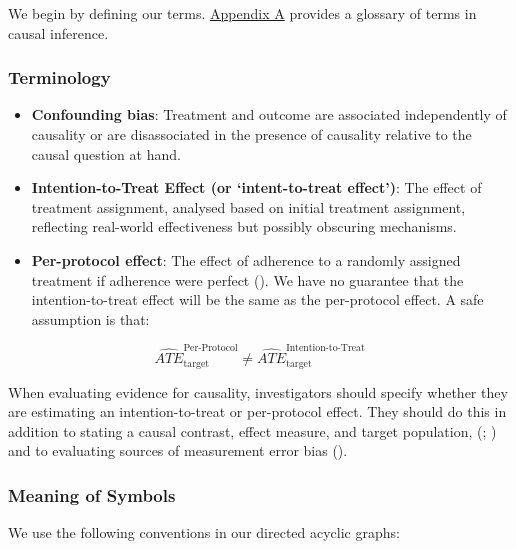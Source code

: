 \documentclass[
  single column]{article}
\begin{document}
We begin by defining our terms. \hyperref[id-app-a]{Appendix A} provides
a glossary of terms in causal inference.

\subsubsection{Terminology}\label{terminology}

\begin{itemize}
\item
  \textbf{Confounding bias}: Treatment and outcome are associated
  independently of causality or are disassociated in the presence of
  causality relative to the causal question at hand.
\item
  \textbf{Intention-to-Treat Effect (or `intent-to-treat effect')}: The
  effect of treatment assignment, analysed based on initial treatment
  assignment, reflecting real-world effectiveness but possibly obscuring
  mechanisms.
\item
  \textbf{Per-protocol effect}: The effect of adherence to a randomly
  assigned treatment if adherence were perfect
  (). We have no
  guarantee that the intention-to-treat effect will be the same as the
  per-protocol effect. A safe assumption is that:
\end{itemize}

\[
\widehat{ATE}_{\text{target}}^{\text{Per-Protocol}} \ne \widehat{ATE}_{\text{target}}^{\text{Intention-to-Treat}}
\]

When evaluating evidence for causality, investigators should specify
whether they are estimating an intention-to-treat or per-protocol
effect. They should do this in addition to stating a causal contrast,
effect measure, and target population,
(;
) and to
evaluating sources of measurement error bias
().

\subsubsection{Meaning of Symbols}\label{meaning-of-symbols}

We use the following conventions in our directed acyclic graphs:
\end{document}
